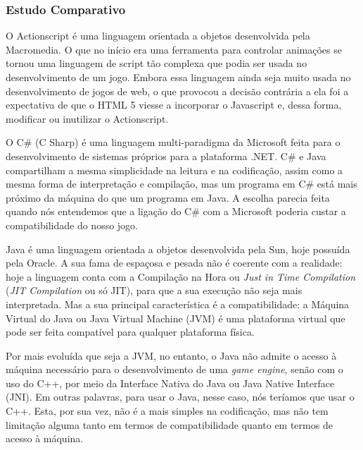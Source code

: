 \subsubsection{Estudo Comparativo}
%
O Actionscript é uma linguagem orientada a objetos desenvolvida pela Macromedia. O que no início era uma ferramenta para controlar animações se tornou uma linguagem de script tão complexa que podia ser usada no desenvolvimento de um jogo. Embora essa linguagem ainda seja muito usada no desenvolvimento de jogos de web, o que provocou a decisão contrária a ela foi a expectativa de que o HTML 5 viesse a incorporar o Javascript e, dessa forma, modificar ou inutilizar o Actionscript.
\par
O C\# (C Sharp) é uma linguagem multi-paradigma da Microsoft feita para o desenvolvimento de sistemas próprios para a plataforma .NET. C\# e Java compartilham a mesma simplicidade na leitura e na codificação, assim como a mesma forma de interpretação e compilação, mas um programa em C\# está mais próximo da máquina do que um programa em Java. A escolha parecia feita quando nós entendemos que a ligação do C\# com a Microsoft poderia custar a compatibilidade do nosso jogo.
\par
Java é uma linguagem orientada a objetos desenvolvida pela Sun, hoje possuída pela Oracle. A sua fama de espaçosa e pesada não é coerente com a realidade: hoje a linguagem conta com a Compilação na Hora ou \textit{Just in Time Compilation} (\textit{JIT Compilation} ou só JIT), para que a sua execução não seja mais interpretada. Mas a sua principal característica é a compatibilidade: a Máquina Virtual do Java ou Java Virtual Machine (JVM) é uma plataforma virtual que pode ser feita compatível para qualquer plataforma física.
\par
Por mais evoluída que seja a JVM, no entanto, o Java não admite o acesso à máquina necessário para o desenvolvimento de uma \textit{game engine}, senão com o uso do C++, por meio da Interface Nativa do Java ou Java Native Interface (JNI). Em outras palavras, para usar o Java, nesse caso, nós teríamos que usar o C++. Esta, por sua vez, não é a mais simples na codificação, mas não tem limitação alguma tanto em termos de 
compatibilidade quanto em termos de acesso à máquina.
%
